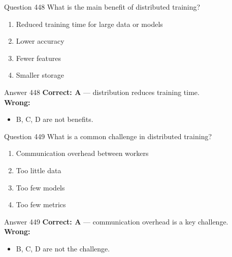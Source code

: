 \documentclass[aspectratio=169,11pt]{beamer}
\begin{document}
	\begin{frame}{Question 448}
		What is the main benefit of distributed training?
		\begin{enumerate}[label=\Alph*.]
			\item Reduced training time for large data or models
			\item Lower accuracy
			\item Fewer features
			\item Smaller storage
		\end{enumerate}
	\end{frame}
	\begin{frame}{Answer 448}
		\textbf{Correct: A} --- distribution reduces training time.\\
		\vspace{0.5em}
		\textbf{Wrong:}
		\begin{itemize}
			\item B, C, D are not benefits.
		\end{itemize}
	\end{frame}
	
	\begin{frame}{Question 449}
		What is a common challenge in distributed training?
		\begin{enumerate}[label=\Alph*.]
			\item Communication overhead between workers
			\item Too little data
			\item Too few models
			\item Too few metrics
		\end{enumerate}
	\end{frame}
	\begin{frame}{Answer 449}
		\textbf{Correct: A} --- communication overhead is a key challenge.\\
		\vspace{0.5em}
		\textbf{Wrong:}
		\begin{itemize}
			\item B, C, D are not the challenge.
		\end{itemize}
	\end{frame}
	
\end{document}
